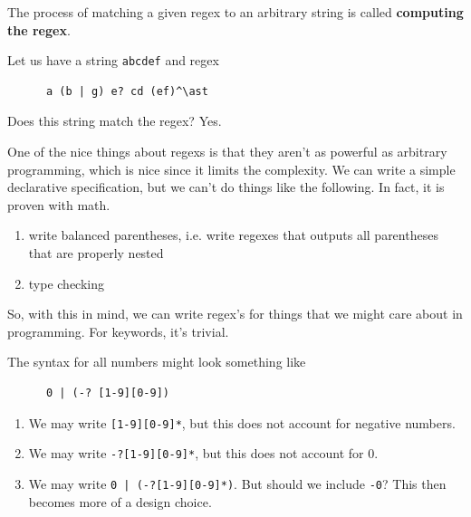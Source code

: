   \begin{definition}
    The process of matching a given regex to an arbitrary string is called \textbf{computing the regex}. 
  \end{definition}

  \begin{example}
    Let us have a string \texttt{abcdef} and regex 
    \begin{lstlisting}
      a (b | g) e? cd (ef)^\ast 
    \end{lstlisting}
    Does this string match the regex? Yes. 
  \end{example}

  One of the nice things about regexs is that they aren't as powerful as arbitrary programming, which is nice since it limits the complexity. We can write a simple declarative specification, but we can't do things like the following. In fact, it is proven with math. 
  \begin{enumerate}
    \item write balanced parentheses, i.e. write regexes that outputs all parentheses that are properly nested
    \item type checking
  \end{enumerate}
  So, with this in mind, we can write regex's for things that we might care about in programming. For keywords, it's trivial. 

  \begin{example}
    
  \end{example}


  \begin{example}[C Identifiers]
    The syntax for all numbers might look something like 
    \begin{lstlisting}
      0 | (-? [1-9][0-9])
    \end{lstlisting}
  \end{example}

  \begin{example} 
    \begin{enumerate}
      \item We may write \texttt{[1-9][0-9]*}, but this does not account for negative numbers. 
      \item We may write \texttt{-?[1-9][0-9]*}, but this does not account for $0$. 
      \item We may write \texttt{0 | (-?[1-9][0-9]*)}. But should we include \texttt{-0}? This then becomes more of a design choice. 
    \end{enumerate}
  \end{example}

